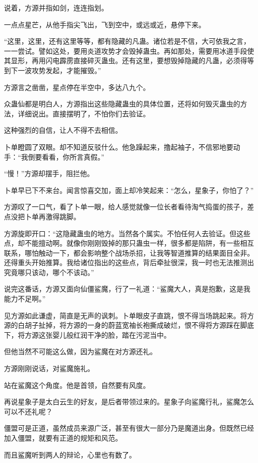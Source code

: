 \begin{this_body}
说着，方源并指如剑，连连指划。

一点点星芒，从他手指尖飞出，飞到空中，或远或近，悬停下来。

“这里，这里，还有这里等等，都有隐藏的凡蛊。诸位若是不信，大可依我之言，一一尝试。譬如这处，要用炎道攻势才会毁掉蛊虫。再如那处，需要用冰道手段使其显形，再用闪电霹雳直接碎灭蛊虫。还有这里，要想毁掉隐藏的凡蛊，必须得等到下一波攻势发起，才能摧毁。”

方源言之凿凿，星点停在半空中，多达八九个。

众蛊仙都是明白人，方源指出这些隐藏蛊虫的具体位置，还将如何毁灭蛊虫的方法，详细说出。直接摆明了，不怕你们去验证。

这种强烈的自信，让人不得不去相信。

卜单瞪圆了双眼。却不知道反驳什么。他急躁起来，撸起袖子，不信邪地要动手：“我倒要看看，你所言真假。”

“慢！”方源却摆手，阻拦他。

卜单早已下不来台。闻言惊喜交加，面上却冷笑起来：“怎么，星象子，你怕了？”

方源叹了一口气，看了卜单一眼，给人感觉就像一位长者看待淘气捣蛋的孩子，差点没把卜单再激得跳脚。

方源旋即开口：“这隐藏蛊虫的地方。当然各个属实。不怕任何人去验证。但这些点，却不能擅动啊。就像你刚刚毁掉的那只蛊虫一样，很多都是陷阱，有一些相互联系，哪怕触动一下，都会影响整个战场杀招，让我等智道推算的结果面目全非。还得重头开始推算。我给诸位指出的这些点，背后牵扯很深，我一时也无法推测出究竟哪只该动，哪个不该动。”

说完这番话，方源又面向仙僵鲨魔，行了一礼道：“鲨魔大人，真是抱歉，这是我能力不足啊。”

见方源如此谦虚，简直是无声的讽刺。卜单眼皮子直跳，恨不得当场跳起来。将方源的白胡子扯掉，将方源的一身的蔚蓝宽袖长袍撕成破烂，恨不得将方源踩在脚底下，将方源这张婴儿般红润干净的脸，踏在污泥当中。

但他当然不可能这么做，因为鲨魔在对方源还礼。

方源刚刚说话，对鲨魔施礼。

站在鲨魔这个角度。他是首领，自然要有风度。

再说星象子是太白云生的好友，是后者带领过来的。星象子向鲨魔行礼，鲨魔怎么可以不还礼呢？

僵盟可是正道，虽然成员来源广泛，甚至有很大一部分乃是魔道出身。但既然已经加入僵盟，就要有正道的规矩和风范。

而且鲨魔听到两人的辩论，心里也有数了。


\end{this_body}
